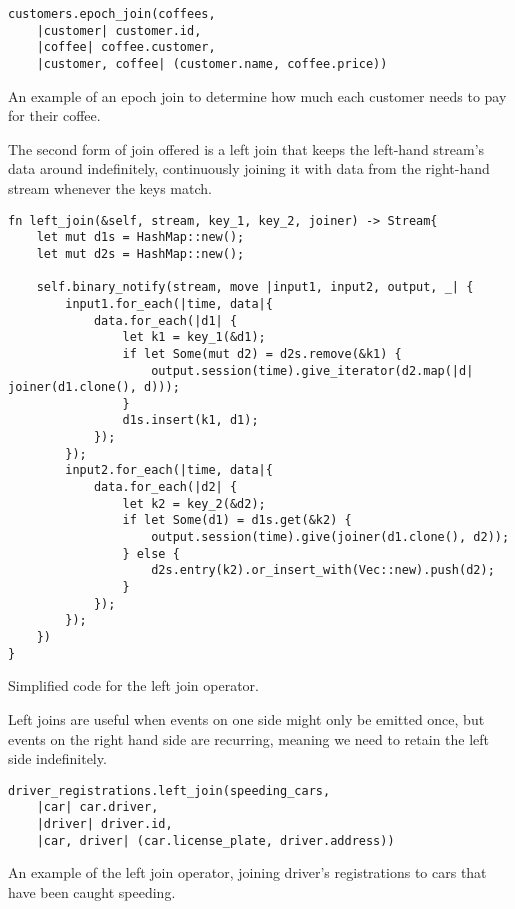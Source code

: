 \begin{listing}[H]
\begin{verbatim}
customers.epoch_join(coffees,
    |customer| customer.id, 
    |coffee| coffee.customer, 
    |customer, coffee| (customer.name, coffee.price))
\end{verbatim}
\caption{An example of an epoch join to determine how much each customer needs to pay for their coffee.}
\label{lst:epoch-join-example}
\end{listing}

The second form of join offered is a left join that keeps the left-hand stream's data around indefinitely, continuously joining it with data from the right-hand stream whenever the keys match.

\begin{listing}[H]
\begin{verbatim}
fn left_join(&self, stream, key_1, key_2, joiner) -> Stream{
    let mut d1s = HashMap::new();
    let mut d2s = HashMap::new();

    self.binary_notify(stream, move |input1, input2, output, _| {
        input1.for_each(|time, data|{
            data.for_each(|d1| {
                let k1 = key_1(&d1);
                if let Some(mut d2) = d2s.remove(&k1) {
                    output.session(time).give_iterator(d2.map(|d| joiner(d1.clone(), d)));
                }
                d1s.insert(k1, d1);
            });
        });
        input2.for_each(|time, data|{
            data.for_each(|d2| {
                let k2 = key_2(&d2);
                if let Some(d1) = d1s.get(&k2) {
                    output.session(time).give(joiner(d1.clone(), d2));
                } else {
                    d2s.entry(k2).or_insert_with(Vec::new).push(d2);
                }
            });
        });
    })
}
\end{verbatim}
  \caption{Simplified code for the left join operator.}
  \label{lst:left-join}
\end{listing}

Left joins are useful when events on one side might only be emitted once, but events on the right hand side are recurring, meaning we need to retain the left side indefinitely.

\begin{listing}[H]
\begin{verbatim}
driver_registrations.left_join(speeding_cars,
    |car| car.driver,
    |driver| driver.id,
    |car, driver| (car.license_plate, driver.address))
\end{verbatim}
\caption{An example of the left join operator, joining driver's registrations to cars that have been caught speeding.}
\label{lst:left-join-example}
\end{listing}

